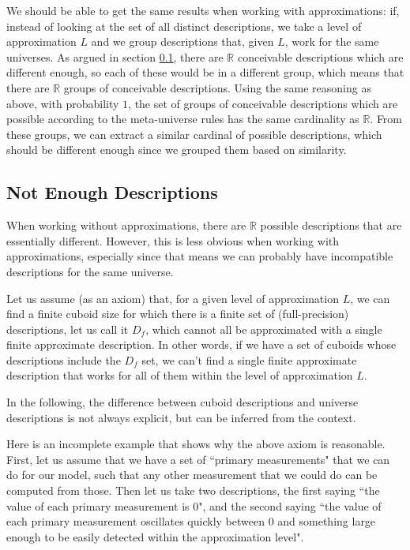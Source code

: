 \documentclass[a4paper
,draft
]{article}
\def\reale{\mathbb{R}}
\newcommand{\ghilimele}[1]{``#1"}
\begin{document}

We should be able to get the same results when working with approximations:
if, instead of looking at the set
of all distinct descriptions, we take a level of approximation $L$
and we group descriptions that, given $L$, work for the same universes.
As argued in section \ref{sec:not-enough-descriptions},
there are $\reale$ conceivable descriptions which are different
enough, so each of these would be in a different group, which means that
there are $\reale$ groups of conceivable descriptions.
Using the same reasoning as above, with probability $1$, the set of groups of
conceivable descriptions which are possible according to the meta-universe
rules has the same cardinality as $\reale$.
From these groups, we can extract a similar cardinal of
possible descriptions, which should be different enough since we grouped them
based on similarity.

\subsection{Not Enough Descriptions}
\label{sec:not-enough-descriptions}

When working without approximations, there are $\reale$ possible descriptions
that are essentially different. However, this is less obvious when working with
approximations, especially since that means we can probably have incompatible
descriptions for the same universe.

Let us assume (as an axiom) that, for a given level of approximation $L$, we can
find a finite cuboid size for which there is a finite set of
(full-precision)
descriptions, let us call it $D_f$, which cannot all be approximated with a
single finite approximate description.
In other words, if we have a set of cuboids whose descriptions include
the $D_f$ set, we can't
find a single finite approximate description that works for all of them
within the level of approximation $L$.

In the following, the difference between
cuboid descriptions and universe descriptions is not always explicit,
but can be inferred from the context.

Here is an incomplete example that shows why the above axiom is reasonable.
First, let us assume that we have a set of
\ghilimele{primary measurements} that we
can do for our model, such that any other measurement that we could do can be
computed from those.
Then let us take two descriptions, the first saying
\ghilimele{the value of each primary measurement is $0$},
and the second saying
\ghilimele{the value of each primary measurement oscillates quickly
  between $0$ and something large enough to be easily detected within
  the approximation level}.
\end{document}
